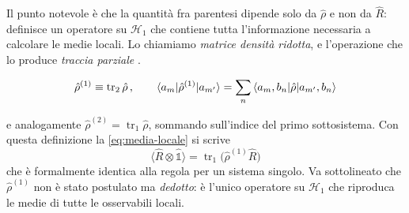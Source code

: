 Il punto notevole è che la quantità fra parentesi dipende solo da
$\hat{\rho}$ e non da $\hat{R}$: definisce un operatore su
$\mathcal{H}_1$ che contiene tutta l'informazione necessaria a calcolare
le medie locali. Lo chiamiamo \emph{matrice densità ridotta}, e
l'operazione che lo produce \emph{traccia parziale}%
.
%
\begin{tcolorbox}[colback=black!5!white, colframe=black!45!white, boxrule=0.8pt]
\begin{equation}
    \hat{\rho}^{(1)} \equiv \operatorname{tr}_2 \hat{\rho} \, , \qquad
    \braket{a_m | \hat{\rho}^{(1)} | a_{m'}} = \sum_n
    \braket{a_m, b_n | \hat{\rho} | a_{m'}, b_n}
    \label{eq:traccia-parziale}
\end{equation}
\end{tcolorbox}
%
e analogamente $\hat{\rho}^{(2)} = \operatorname{tr}_1 \hat{\rho}$,
sommando sull'indice del primo sottosistema. Con questa definizione la
\eqref{eq:media-locale} si scrive
%
\begin{equation}
    \bigl\langle \hat{R} \otimes \hat{\mathbb{1}} \bigr\rangle
    = \operatorname{tr}_1 \bigl( \hat{\rho}^{(1)} \hat{R} \bigr)
    \label{eq:media-ridotta}
\end{equation}
%
che è formalmente identica alla regola per un sistema singolo. Va
sottolineato che $\hat{\rho}^{(1)}$ non è stato postulato ma
\emph{dedotto}: è l'unico operatore su $\mathcal{H}_1$ che riproduca le
medie di tutte le osservabili locali.

